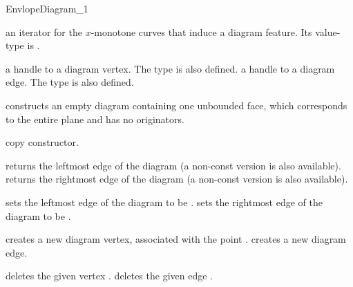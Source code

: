 \begin{ccRefConcept}{EnvlopeDiagram_1}

{an iterator for the $x$-monotone curves that induce a diagram feature.
 Its value-type is .}

\ccGlue
{}

{a handle to a diagram vertex.
 The  type is also defined.}
\ccGlue
{}
{a handle to a diagram edge.
 The  type is also defined.}

\ccCreation
{}

    {constructs an empty diagram containing one unbounded face,
     which corresponds to the entire plane and has no originators.}
    
    {copy constructor.}
        
\ccAccessFunctions

    {returns the leftmost edge of the diagram (a non-const version is also available).}
\ccGlue
{}
    {returns the rightmost edge of the diagram (a non-const version is also available).}

\ccModifiers

    {sets the leftmost edge of the diagram to be .}
\ccGlue
{}
    {sets the rightmost edge of the diagram to be .}

    {creates a new diagram vertex, associated with the point .}
\ccGlue
{}
    {creates a new diagram edge.}
    
    {deletes the given vertex .}
\ccGlue
{}
    {deletes the given edge .}

\ccSeeAlso
     \\
     \\

\end{ccRefConcept}

\ccRefPageEnd

